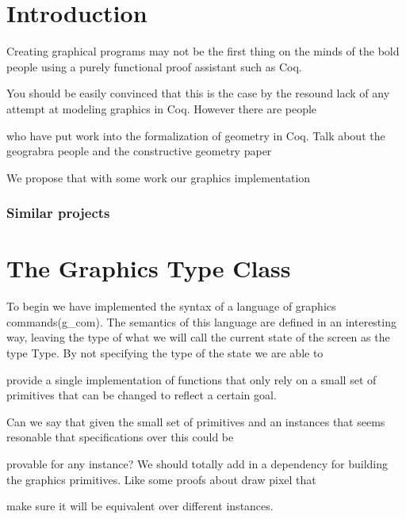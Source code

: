 \documentclass{llncs}
\begin{document}
\section{Introduction}

Creating graphical programs may not be the first thing on the minds of the bold people using a purely functional proof assistant such as Coq.

You should be easily convinced that this is the case by the resound lack of any attempt at modeling graphics in Coq.  However there are people

who have put work into the formalization of geometry in Coq.  {\color{red} Talk about the geograbra people and the constructive geometry paper}

 We propose that with some work our graphics implementation 



\subsubsection{Similar projects} 





 \section{The Graphics Type Class}

 To begin we have implemented the syntax of a language of graphics commands(g\_com). The semantics of this language are defined in an interesting way, leaving the type of what we will call the current state of the screen as the type Type.  By not specifying the type of the state we are able to

 provide a single implementation of functions that only rely on a small set of primitives that can be changed to reflect a certain goal.

 {\color{red} Can we say that given the small set of primitives and an instances that seems resonable that specifications over this could be

   provable for any instance? We should totally add in a dependency for building the graphics primitives.  Like some proofs about draw pixel that

  make sure it will be equivalent over different instances. }
\end{document}
